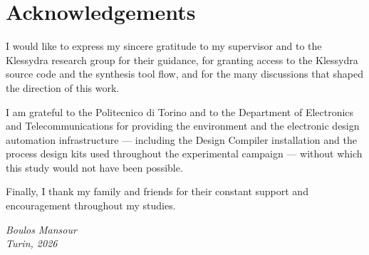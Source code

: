\chapter*{Acknowledgements}

I would like to express my sincere gratitude to my supervisor and to the
Klessydra research group for their guidance, for granting access to the
Klessydra source code and the synthesis tool flow, and for the many discussions
that shaped the direction of this work.

I am grateful to the Politecnico di Torino and to the Department of Electronics
and Telecommunications for providing the environment and the electronic design
automation infrastructure --- including the Design Compiler installation and the
process design kits used throughout the experimental campaign --- without which
this study would not have been possible.

Finally, I thank my family and friends for their constant support and
encouragement throughout my studies.

\vspace{2cm}
\begin{flushright}
\textit{Boulos Mansour}\\
\textit{Turin, 2026}
\end{flushright}
